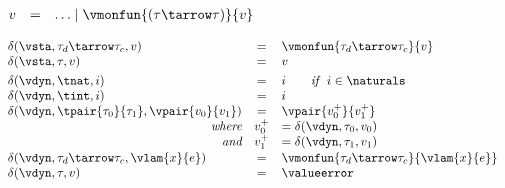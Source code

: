 {\flushleft

$\begin{array}{l c l}
  v & = & \ldots \mid \vmonfun{(\tau\tarrow\tau)}{v}
\end{array}$

\medskip
{}
\begin{mathpar}
\end{mathpar}

\medskip
{}
$\begin{array}{l c l}
  \delta(\vsta, \tau_d \tarrow \tau_c, v) & = & \vmonfun{\tau_d \tarrow \tau_c}{v}
\\
  \delta(\vsta, \tau, v) & = & v
\\[0.8ex]
  \delta(\vdyn, \tnat, i) & = & i \qquad \emph{if}~~i \in \naturals
\\
  \delta(\vdyn, \tint, i) & = & i
\\
  \delta(\vdyn, \tpair{\tau_0}{\tau_1}, \vpair{v_0}{v_1}) & = & \vpair{v_0^+}{v_1^+}
\\
  \hfill\emph{where} & v_0^+ & = \delta(\vdyn, \tau_0, v_0)
\\
  \hfill\emph{and} & v_1^+ & = \delta(\vdyn, \tau_1, v_1)
\\[0.2ex]
  \delta(\vdyn, \tau_d \tarrow \tau_c, \vlam{x}{e}) & = & \vmonfun{\tau_d \tarrow \tau_c}{\vlam{x}{e}}
\\
  \delta(\vdyn, \tau, v) & = & \valueerror
\end{array}$

\medskip
\begin{minipage}{0.5\columnwidth}
\begin{mathpar}
\end{mathpar}
\end{minipage}%
\begin{minipage}{0.5\columnwidth}
\begin{mathpar}
\end{mathpar}
\end{minipage}
}
